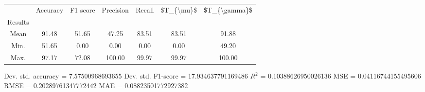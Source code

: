 \begin{tabular}{|c|c|c|c|c|c|c|}
\toprule
{} &  Accuracy &  F1 score &  Precision &  Recall &  \$T\_\{\textbackslash mu\}\$ &  \$T\_\{\textbackslash gamma\}\$ \\
Results &           &           &            &         &            &               \\
\hline
Mean    &     91.48 &     51.65 &      47.25 &   83.51 &      83.51 &         91.88 \\
Min.    &     51.65 &      0.00 &       0.00 &    0.00 &       0.00 &         49.20 \\
Max.    &     97.17 &     72.08 &     100.00 &   99.97 &      99.97 &        100.00 \\
\bottomrule
\end{tabular}

 Dev. std. accuracy = 7.57500968693655
 Dev. std. F1-score = 17.934637791169486
 $R^2$ = 0.10388626950026136
 MSE = 0.04116744155495606
 RMSE = 0.20289761347772442
 MAE = 0.08823501772927382